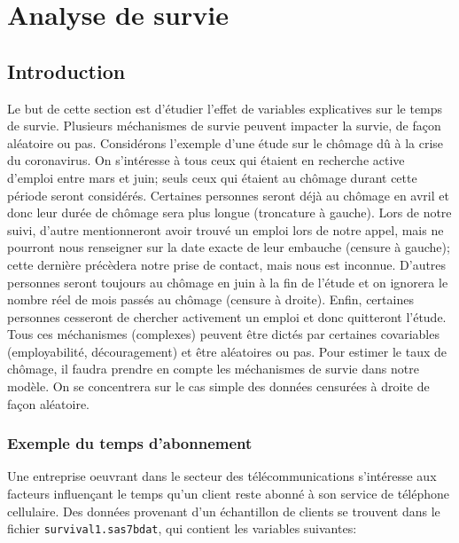 \documentclass[
  11pt,
  letterpaper,
]{book}
\theoremstyle{definition}
\theoremstyle{definition}
\theoremstyle{definition}
\theoremstyle{definition}
\theoremstyle{remark}
\begin{document}
\hypertarget{analyse-survie}{%
\chapter{Analyse de survie}\label{analyse-survie}}

\hypertarget{introduction-5}{%
\section{Introduction}\label{introduction-5}}

Le but de cette section est d'étudier l'effet de variables explicatives sur le temps de survie. Plusieurs méchanismes de survie peuvent impacter la survie, de façon aléatoire ou pas.
Considérons l'exemple d'une étude sur le chômage dû à la crise du coronavirus. On s'intéresse à tous ceux qui étaient en recherche active d'emploi entre mars et juin; seuls ceux qui étaient au chômage durant cette période seront considérés. Certaines personnes seront déjà au chômage en avril et donc leur durée de chômage sera plus longue (troncature à gauche). Lors de notre suivi, d'autre mentionneront avoir trouvé un emploi lors de notre appel, mais ne pourront nous renseigner sur la date exacte de leur embauche (censure à gauche); cette dernière précèdera notre prise de contact, mais nous est inconnue. D'autres personnes seront toujours au chômage en juin à la fin de l'étude et on ignorera le nombre réel de mois passés au chômage (censure à droite). Enfin, certaines personnes cesseront de chercher activement un emploi et donc quitteront l'étude. Tous ces méchanismes (complexes) peuvent être dictés par certaines covariables (employabilité, découragement) et être aléatoires ou pas. Pour estimer le taux de chômage, il faudra prendre en compte les méchanismes de survie dans notre modèle. On se concentrera sur le cas simple des données censurées à droite de façon aléatoire.

\hypertarget{exemple-du-temps-dabonnement}{%
\subsection{Exemple du temps d'abonnement}\label{exemple-du-temps-dabonnement}}

Une entreprise oeuvrant dans le secteur des télécommunications s'intéresse aux facteurs influençant le temps qu'un client reste abonné à son service de téléphone cellulaire. Des données provenant d'un échantillon de clients se trouvent dans le fichier \texttt{survival1.sas7bdat}, qui contient les variables suivantes:
\end{document}
